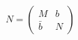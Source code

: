 \begin{equation}
N= \left(
\begin{array}{cc}
M & b \\
\bar{b} & N
\end{array} \right)
\end{equation} 
